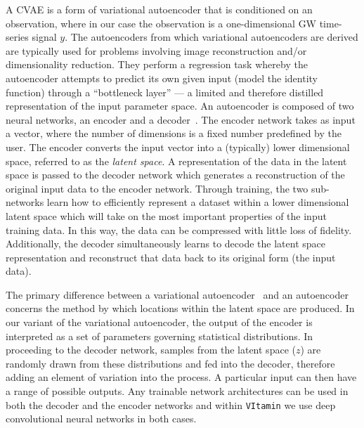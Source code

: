 \documentclass[%
showpacs,
nofootinbib,
 amsmath,amssymb,
 aps,
 twocolumn,
 prl,
 reprint,
floatfix,
]{revtex4-1}
\begin{document}
%
%
A \ac{CVAE} is a form of variational autoencoder that is
conditioned on an observation, where in our case the observation is a
one-dimensional \ac{GW} time-series signal $y$. The autoencoders from which
variational autoencoders are derived are typically used for problems involving
image reconstruction and/or dimensionality reduction. They perform a regression
task whereby the autoencoder attempts to predict its own given input (model the
identity function) through a ``bottleneck layer'' --- a limited  and therefore
distilled representation of the input parameter space. An autoencoder is
composed of two neural networks, an encoder and a
decoder~\cite{gallinari1987memoires}.  The encoder network takes as input a
vector, where the number of dimensions is a fixed number predefined by the
user. The encoder converts the input vector into a (typically) lower
dimensional space, referred to as the {\it{latent space}}. A representation of
the data in the latent space is passed to the decoder network which generates a
reconstruction of the original input data to the encoder network. Through
training, the two sub-networks learn how to efficiently represent a dataset
within a lower dimensional latent space which will take on the most important
properties of the input training data. In this way, the data can be compressed
with little loss of fidelity. Additionally, the decoder simultaneously learns
to decode the latent space representation and reconstruct that data back to its
original form (the input data).

%
%
The primary difference between a variational autoencoder~\cite{1812.04405} and
an autoencoder concerns the method by which locations within the latent space
are produced. In our variant of the variational autoencoder, the output of the
encoder is interpreted as a set of parameters governing statistical
distributions. In proceeding to the decoder network, samples from the latent
space ($z$) are randomly drawn from these distributions and fed into the
decoder, therefore adding an element of variation into the process. A
particular input can then have a range of possible outputs. Any trainable
network architectures can be used in both the decoder and the encoder networks
and within \texttt{VItamin} we use deep convolutional neural networks in both
cases.

\end{document}
